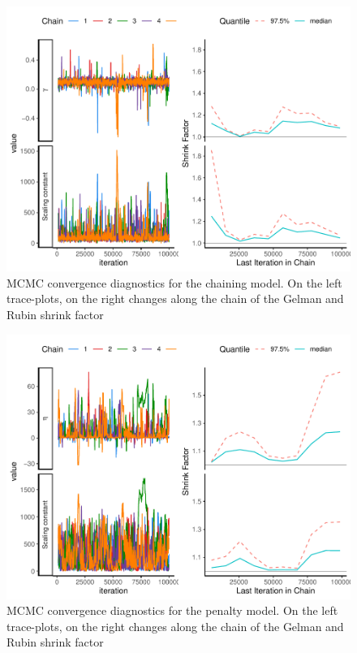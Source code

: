 \documentclass[
  12pt,
]{article}
\begin{document}
\begin{figure}
\includegraphics[width=1\linewidth]{manuscript_BE_files/figure-latex/diaggamPAA-1} \caption{MCMC convergence diagnostics for the chaining model. On the left trace-plots, on the right changes along the chain of the Gelman and Rubin shrink factor }\label{fig:diaggamPAA}
\end{figure}

\begin{figure}
\includegraphics[width=1\linewidth]{manuscript_BE_files/figure-latex/diagNegPAA-1} \caption{MCMC convergence diagnostics for the penalty model. On the left trace-plots, on the right changes along the chain of the Gelman and Rubin shrink factor}\label{fig:diagNegPAA}
\end{figure}
\end{document}
